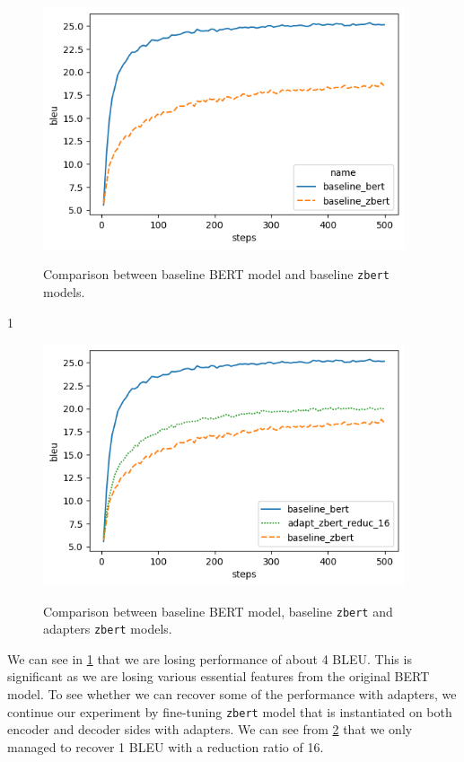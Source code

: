 \begin{figure}[]
    {\includegraphics[width=0.95\textwidth]{img/baseline_zbert.png}}
    \centering
    \caption{Comparison between baseline BERT model and baseline \texttt{zbert} models.}
    \label{img:baseline_zbert}
\end{figure}1

\begin{figure}[]
    {\includegraphics[width=0.95\textwidth]{img/adapter_zbert.png}}
    \centering
    \caption{Comparison between baseline BERT model, baseline \texttt{zbert} and adapters \texttt{zbert} models.}
    \label{img:adapter_zbert}
\end{figure}

We can see in \cref{img:baseline_zbert} that we are losing performance of about 4 BLEU. This is significant as we are losing various essential features from the original BERT model. To see whether we can recover some of the performance with adapters, we continue our experiment by fine-tuning \texttt{zbert} model that is instantiated on both encoder and decoder sides with adapters. We can see from \cref{img:adapter_zbert} that we only managed to recover 1 BLEU with a reduction ratio of 16.

